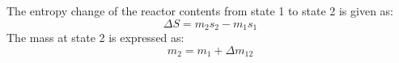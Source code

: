 The entropy change of the reactor contents from state 1 to state 2 is given as:  
\[
\Delta S = m_2 s_2 - m_1 s_1
\]  
The mass at state 2 is expressed as:  
\[
m_2 = m_1 + \Delta m_{12}
\]